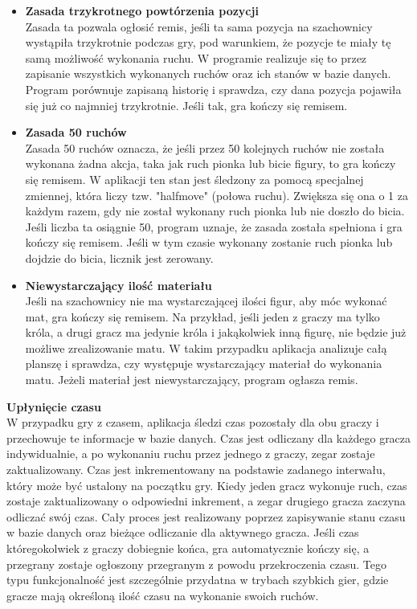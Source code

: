 \documentclass[12pt,a4paper]{article}
\begin{document}
\begin{itemize}
    \item \textbf{Zasada trzykrotnego powtórzenia pozycji}\\
    Zasada ta pozwala ogłosić remis, jeśli ta sama pozycja na szachownicy wystąpiła trzykrotnie podczas gry, pod warunkiem, że pozycje te miały tę samą możliwość wykonania ruchu. W programie realizuje się to przez zapisanie wszystkich wykonanych ruchów oraz ich stanów w bazie danych. Program porównuje zapisaną historię i sprawdza, czy dana pozycja pojawiła się już co najmniej trzykrotnie. Jeśli tak, gra kończy się remisem.
    \item \textbf{Zasada 50 ruchów}\\
    Zasada 50 ruchów oznacza, że jeśli przez 50 kolejnych ruchów nie została wykonana żadna akcja, taka jak ruch pionka lub bicie figury, to gra kończy się remisem. W aplikacji ten stan jest śledzony za pomocą specjalnej zmiennej, która liczy tzw. "halfmove" (połowa ruchu). Zwiększa się ona o 1 za każdym razem, gdy nie został wykonany ruch pionka lub nie doszło do bicia. Jeśli liczba ta osiągnie 50, program uznaje, że zasada została spełniona i gra kończy się remisem. Jeśli w tym czasie wykonany zostanie ruch pionka lub dojdzie do bicia, licznik jest zerowany.
    \item \textbf{Niewystarczający ilość materiału}\\
    Jeśli na szachownicy nie ma wystarczającej ilości figur, aby móc wykonać mat, gra kończy się remisem. Na przykład, jeśli jeden z graczy ma tylko króla, a drugi gracz ma jedynie króla i jakąkolwiek inną figurę, nie będzie już możliwe zrealizowanie matu. W takim przypadku aplikacja analizuje całą planszę i sprawdza, czy występuje wystarczający materiał do wykonania matu. Jeżeli materiał jest niewystarczający, program ogłasza remis.
\end{itemize}

\noindent \textbf{Upłynięcie czasu}\\
W przypadku gry z czasem, aplikacja śledzi czas pozostały dla obu graczy i przechowuje te informacje w bazie danych. Czas jest odliczany dla każdego gracza indywidualnie, a po wykonaniu ruchu przez jednego z graczy, zegar zostaje zaktualizowany. Czas jest inkrementowany na podstawie zadanego interwału, który może być ustalony na początku gry. Kiedy jeden gracz wykonuje ruch, czas zostaje zaktualizowany o odpowiedni inkrement, a zegar drugiego gracza zaczyna odliczać swój czas. Cały proces jest realizowany poprzez zapisywanie stanu czasu w bazie danych oraz bieżące odliczanie dla aktywnego gracza. Jeśli czas któregokolwiek z graczy dobiegnie końca, gra automatycznie kończy się, a przegrany zostaje ogłoszony przegranym z powodu przekroczenia czasu. Tego typu funkcjonalność jest szczególnie przydatna w trybach szybkich gier, gdzie gracze mają określoną ilość czasu na wykonanie swoich ruchów.
\end{document}
